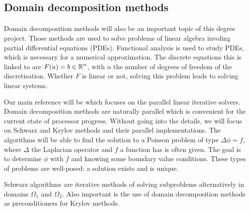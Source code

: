 \subsection{Domain decomposition methods}

\paragraph{}
Domain decomposition methods will also be an important topic of this degree project.
Those methods are used to solve problems of linear algebra involing partial differential equations (PDEs).
Functional analysis is used to study PDEs, which is necessary for a numerical approximation.
The discrete equations this is linked to are \(F(u) = b \in \operatorname{\mathbb{R}}^n\), with \(n\) the number of degrees of freedom of the discretisation.
Whether \(F\) is linear or not, solving this problem leads to solving linear systems.

Our main reference will be \cite{dolean_domain_2015} which focuses on the parallel linear iterative solvers.
Domain decomposition methods are naturally parallel which is convenient for the current state of processor progress.
Without going into the details, we will focus on Schwarz and Krylov methods and their parallel implementations.
The algorithms will be able to find the solution to a Poisson problem of type \(\Delta \phi = f\), where \(\Delta\) the Laplacian operator and \(f\) a function has is often given.
The goal is to determine \(\phi\) with \(f\) and knowing some boundary value conditions.
These types of problems are well-posed: a solution exists and is unique.

Schwarz algorithms are iterative methods of solving subproblems alternatively in domains \(\Omega_1\) and \(\Omega_2\).
Also important is the use of domain decomposition methods as preconditioners for Krylov methods.
